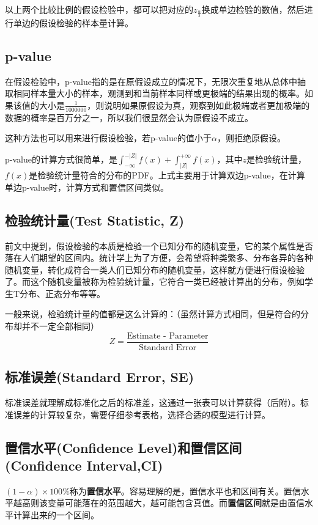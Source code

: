\documentclass[UTF8]{ctexbook}
\begin{document}
以上两个比较比例的假设检验中，都可以把对应的$z_\frac{\alpha}{2}$换成单边检验的数值，然后进行单边的假设检验的样本量计算。

\subsection{p-value}
在假设检验中，p-value指的是在原假设成立的情况下，无限次重复地从总体中抽取相同样本量大小的样本，观测到和当前样本同样或更极端的结果出现的概率。如果该值的大小是$\frac{1}{1000000}$，则说明如果原假设为真，观察到如此极端或者更加极端的数据的概率是百万分之一，所以我们很显然会认为原假设不成立。

这种方法也可以用来进行假设检验，若p-value的值小于$\alpha$，则拒绝原假设。

p-value的计算方式很简单，是$\int_{-\infty}^{-|Z|}f(x)+\int_{|Z|}^{+\infty}f(x)$，其中$z$是检验统计量，$f(x)$是检验统计量符合的分布的PDF。上式主要用于计算双边p-value，在计算单边p-value时，计算方式和置信区间类似。

\subsection{检验统计量(Test Statistic, Z)}
前文中提到，假设检验的本质是检验一个已知分布的随机变量，它的某个属性是否落在人们期望的区间内。统计学上为了方便，会希望将种类繁多、分布各异的各种随机变量，转化成符合一类人们已知分布的随机变量，这样就方便进行假设检验了。而这个随机变量被称为检验统计量，它符合一类已经被计算出的分布，例如学生T分布、正态分布等等。

一般来说，检验统计量的值都是这么计算的：（虽然计算方式相同，但是符合的分布却并不一定全部相同）
\[
Z=\frac{\text{Estimate\ -\ Parameter}}{\text{Standard Error}}
\]
\subsection{标准误差(Standard Error, SE)}
标准误差就理解成标准化之后的标准差，这通过一张表可以计算获得（后附）。标准误差的计算较复杂，需要仔细参考表格，选择合适的模型进行计算。
\subsection{置信水平(Confidence Level)和置信区间(Confidence Interval,CI)}
$(1-\alpha)\times 100\%$称为\textbf{置信水平}。容易理解的是，置信水平也和区间有关。置信水平越高则该变量可能落在的范围越大，越可能包含真值。而\textbf{置信区间}就是由置信水平计算出来的一个区间。
\end{document}
